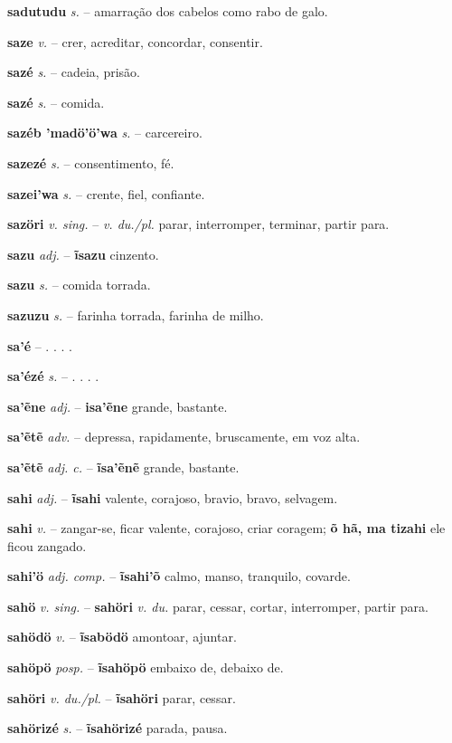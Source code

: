 \textbf{sadutudu} \textit{s.} -- amarração dos cabelos como rabo de galo.

\textbf{saze} \textit{v.} -- crer, acreditar, concordar, consentir.

\textbf{sazé} \textit{s.} -- cadeia, prisão.

\textbf{sazé} \textit{s.} -- comida.

\textbf{sazéb 'madö'ö'wa} \textit{s.} -- carcereiro.

\textbf{sazezé} \textit{s.} -- consentimento, fé.

\textbf{sazei'wa} \textit{s.} -- crente, fiel, confiante.

\textbf{sazöri} \textit{v. sing.} -- \textit{v. du./pl.} parar, interromper, terminar, partir para.

\textbf{sazu} \textit{adj.} -- \textbf{ĩsazu} cinzento.

\textbf{sazu} \textit{s.} -- comida torrada.

\textbf{sazuzu} \textit{s.} -- farinha torrada, farinha de milho.

\textbf{sa'é} \textit{} -- . . . .

\textbf{sa'ézé} \textit{s.} -- . . . .

\textbf{sa'ẽne} \textit{adj.} -- \textbf{isa'ẽne} grande, bastante.

\textbf{sa'ẽtẽ} \textit{adv.} -- depressa, rapidamente, bruscamente, em voz alta.

\textbf{sa'ẽtẽ} \textit{adj. c.} -- \textbf{ĩsa'ẽnẽ} grande, bastante.

\textbf{sahi} \textit{adj.} -- \textbf{ĩsahi} valente, corajoso, bravio, bravo, selvagem.

\textbf{sahi} \textit{v.} -- zangar-se, ficar valente, corajoso, criar coragem; \textbf{õ hã, ma tizahi} ele ficou zangado.

\textbf{sahi'ö} \textit{adj. comp.} -- \textbf{ĩsahi'õ} calmo, manso, tranquilo, covarde.

\textbf{sahö} \textit{v. sing.} -- \textbf{sahöri} \textit{v. du.} parar, cessar, cortar, interromper, partir para.

\textbf{sahödö} \textit{v.} -- \textbf{ĩsabödö} amontoar, ajuntar.

\textbf{sahöpö} \textit{posp.} -- \textbf{ĩsahöpö} embaixo de, debaixo de.

\textbf{sahöri} \textit{v. du./pl.} -- \textbf{ĩsahöri} parar, cessar.

\textbf{sahörizé} \textit{s.} -- \textbf{ĩsahörizé} parada, pausa.

